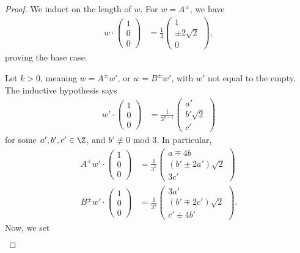 \begin{proof}
  We induct on the length of $w$. For $w = A^{\pm}$, we have
  \begin{align*}
    w\cdot \begin{pmatrix}1\\0\\0\end{pmatrix} &= \frac{1}{3}\begin{pmatrix}1\\\pm2\sqrt{2}\\0\end{pmatrix},
  \end{align*}
  proving the base case.\newline

  Let $k > 0$, meaning $w = A^{\pm}w'$, or $w = B^{\pm}w'$, with $w'$ not equal to the empty. The inductive hypothesis says
  \begin{align*}
    w'\cdot \begin{pmatrix}1\\0\\0\end{pmatrix} &= \frac{1}{3^{k-1}} \begin{pmatrix}a'\\b'\sqrt{2}\\c'\end{pmatrix}
  \end{align*}
  for some $a',b',c'\in \Z$, and $b'\nequiv 0$ mod $3$. In particular,
  \begin{align*}
    A^{\pm}w' \cdot \begin{pmatrix}1\\0\\0\end{pmatrix} &= \frac{1}{3^k} \begin{pmatrix}a\mp 4b \\ \left(b'\pm 2a'\right)\sqrt{2} \\ 3c'\end{pmatrix}\\
    B^{\pm}w' \cdot \begin{pmatrix}1\\0\\0\end{pmatrix} &= \frac{1}{3^k} \begin{pmatrix}3a' \\ \left(b'\mp 2c'\right)\sqrt{2} \\ c'\pm 4b'\end{pmatrix}.
  \end{align*}
  Now, we set
  \begin{align*}

\end{align*}
\end{proof}
